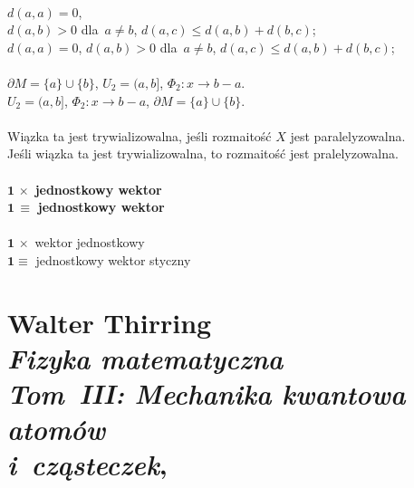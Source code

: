 \documentclass[a4paper,11pt]{article}
\numberwithin{equation}{section}
\begin{document}
\VerSpaceTwo


\noindent
{} \\
\Jest $d( a, a ) = 0$, \\[0.1em]
$d( a,b ) > 0$ dla~$a \neq b$, $d( a, c ) \leq d( a, b ) + d( b,c )$; \\[0.3em]
\PowinnoByc $d( a, a ) = 0$, $d( a,b ) > 0$ dla~$a \neq b$,
$d( a, c ) \leq d( a, b ) + d( b,c )$; \\[0.3em]
 \\[0.3em]
\Jest $\partial M = \{ a \} \cup \{ b \}$, $U_{ 2 } = ( a, b ]$,
$\Phi_{ 2 } : x \rightarrow b - a$. \\[0.3em]
\PowinnoByc $U_{ 2 } = ( a, b ]$, $\Phi_{ 2 } : x \rightarrow b - a$,
$\partial M = \{ a \} \cup \{ b \}$. \\[0.3em]
 \\
\Jest Wiązka ta jest trywializowalna, jeśli rozmaitość $X$ jest
paralelyzowalna. \\
\PowinnoByc Jeśli wiązka ta jest trywializowalna, to rozmaitość jest
pralelyzowalna. \\
 \\
\Jest $\mathbf{ 1 } \, \times$ \textbf{jednostkowy wektor} \\
\PowinnoByc $\mathbf{ 1 } \, \equiv$ \textbf{jednostkowy wektor} \\
 \\
\Jest $\mathbf{ 1 } \, \times$ wektor jednostkowy \\
\PowinnoByc $\mathbf{ 1 } \equiv$ jednostkowy wektor styczny \\
















\section{Walter Thirring \\
  \textit{Fizyka matematyczna} \\
  \textit{Tom~III: Mechanika kwantowa atomów} \\
  \textit{i~cząsteczek}, \cite{ThirringFizykaMatematycznaVolIV1987}}
\end{document}

